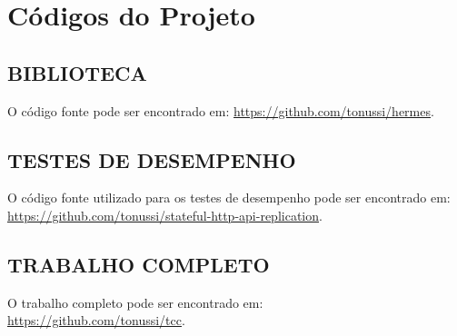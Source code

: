 \chapter{Códigos do Projeto}

\section{BIBLIOTECA}

O código fonte pode ser encontrado em: \url{https://github.com/tonussi/hermes}.

\section{TESTES DE DESEMPENHO}

O código fonte utilizado para os testes de desempenho pode ser encontrado
em: \url{https://github.com/tonussi/stateful-http-api-replication}.

\section{TRABALHO COMPLETO}

O trabalho completo pode ser encontrado em:\\\url{https://github.com/tonussi/tcc}.
